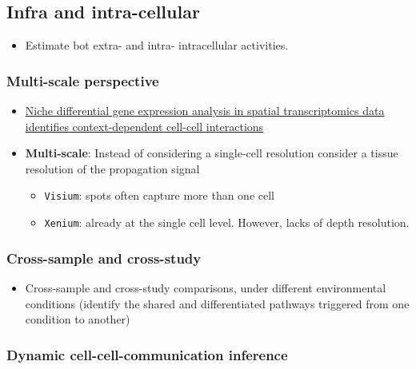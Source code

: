 \documentclass[
  letterpaper,
]{book}
\providecommand{\tightlist}{%
  \setlength{\itemsep}{0pt}\setlength{\parskip}{0pt}}\usepackage{longtable,booktabs,array}
\begin{document}
\subsection{Infra and intra-cellular}\label{infra-and-intra-cellular}

\begin{itemize}
\tightlist
\item
  Estimate bot extra- and intra- intracellular activities.
\end{itemize}

\subsubsection{Multi-scale perspective}\label{multi-scale-perspective}

\begin{itemize}
\item
  \href{https://www.biorxiv.org/content/10.1101/2023.01.03.522646v1.full.pdf}{Niche
  differential gene expression analysis in spatial transcriptomics data
  identifies context-dependent cell-cell interactions}
\item
  \textbf{Multi-scale}: Instead of considering a single-cell resolution
  consider a tissue resolution of the propagation signal

  \begin{itemize}
  \tightlist
  \item
    \texttt{Visium}: spots often capture more than one cell
  \item
    \texttt{Xenium}: already at the single cell level. However, lacks of
    depth resolution.
  \end{itemize}
\end{itemize}

\subsubsection{Cross-sample and
cross-study}\label{cross-sample-and-cross-study}

\begin{itemize}
\tightlist
\item
  Cross-sample and cross-study comparisons, under different
  environmental conditions (identify the shared and differentiated
  pathways triggered from one condition to another)
\end{itemize}

\subsubsection{Dynamic cell-cell-communication
inference}\label{dynamic-cell-cell-communication-inference}
\end{document}
